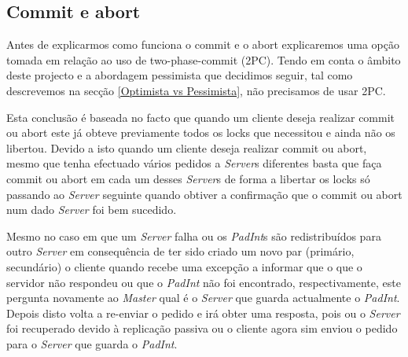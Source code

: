 \subsection{Commit e abort}

Antes de explicarmos como funciona o commit e o abort explicaremos uma opção tomada em relação ao uso de two-phase-commit (2PC). Tendo em conta o âmbito deste projecto e a abordagem pessimista que decidimos seguir, tal como descrevemos na secção \ref{Optimista vs Pessimista}, não precisamos de usar 2PC.

Esta conclusão é baseada no facto que quando um cliente deseja realizar commit ou abort este já obteve previamente todos os locks que necessitou e ainda não os libertou. Devido a isto quando um cliente deseja realizar commit ou abort, mesmo que tenha efectuado vários pedidos a \textit{Server}s diferentes basta que faça commit ou abort em cada um desses \textit{Server}s de forma a libertar os locks só passando ao \textit{Server} seguinte quando obtiver a confirmação que o commit ou abort num dado \textit{Server} foi bem sucedido.

Mesmo no caso em que um \textit{Server} falha ou os \textit{PadInt}s são redistribuídos para outro \textit{Server} em consequência de ter sido criado um novo par (primário, secundário) o cliente quando recebe uma excepção a informar que o que o servidor não respondeu ou que o \textit{PadInt} não foi encontrado, respectivamente, este pergunta novamente ao \textit{Master} qual é o \textit{Server} que guarda actualmente o \textit{PadInt}. Depois disto volta a re-enviar o pedido e irá obter uma resposta, pois ou o \textit{Server} foi recuperado devido à replicação passiva ou o cliente agora sim enviou o pedido para o \textit{Server} que guarda o \textit{PadInt}.



